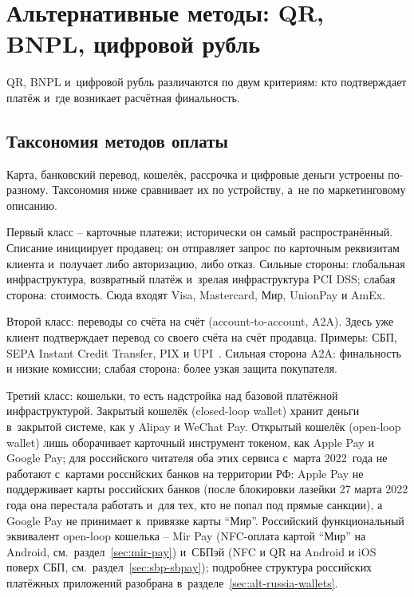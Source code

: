 
\chapter{Альтернативные методы: QR, BNPL, цифровой рубль}\label{ch:alt-methods}
QR, BNPL и~цифровой рубль различаются по двум критериям:
кто подтверждает платёж и~где возникает расчётная финальность.

\section{Таксономия методов оплаты}\label{sec:alt-taxonomy}

Карта, банковский перевод, кошелёк, рассрочка и цифровые деньги
устроены по-разному. Таксономия ниже сравнивает их по устройству,
а~не по маркетинговому описанию.

Первый класс -- карточные платежи; исторически он самый
распространённый. Списание инициирует продавец: он отправляет
запрос по карточным реквизитам клиента и~получает либо авторизацию,
либо отказ. Сильные стороны: глобальная инфраструктура, возвратный платёж
и~зрелая инфраструктура PCI DSS; слабая сторона: стоимость. Сюда входят
Visa, Mastercard, Мир, UnionPay и AmEx.

Второй класс: переводы со счёта на счёт (account-to-account, A2A).
Здесь уже клиент подтверждает перевод со своего счёта на счёт продавца.
Примеры: СБП, SEPA Instant Credit Transfer, PIX и UPI~\cite{sbp-main,sepa-instant,pix,upi}.
Сильная сторона A2A: финальность и низкие комиссии; слабая сторона:
более узкая защита покупателя.

Третий класс: кошельки, то есть надстройка над базовой платёжной
инфраструктурой. Закрытый кошелёк (closed-loop wallet) хранит деньги
в~закрытой системе, как у Alipay и WeChat Pay. Открытый кошелёк
(open-loop wallet) лишь оборачивает карточный
инструмент токеном, как Apple Pay и Google Pay; для российского
читателя оба этих сервиса с~марта 2022~года не работают
с~картами российских банков на территории РФ: Apple Pay
не поддерживает карты российских банков (после блокировки
лазейки 27 марта 2022 года она перестала работать и~для тех,
кто не попал под прямые санкции), а Google Pay не принимает
к~привязке карты \enquote{Мир}. Российский функциональный
эквивалент open-loop кошелька -- Mir Pay (NFC-оплата картой
\enquote{Мир} на Android, см.\ раздел~\ref{sec:mir-pay})
и~СБПэй (NFC и QR на Android и iOS поверх СБП, см.\
раздел~\ref{sec:sbp-sbpay}); подробнее структура российских
платёжных приложений разобрана в~разделе~\ref{sec:alt-russia-wallets}.

